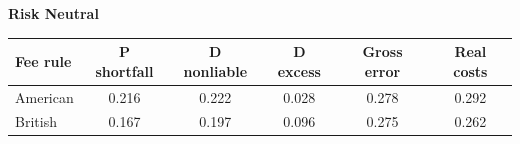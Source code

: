 \documentclass[10pt,border=5pt,varwidth=17cm]{standalone}
\begin{document}
\begingroup
\small
\setlength{\tabcolsep}{5pt}
\renewcommand{\arraystretch}{1.20}
\noindent\textbf{Risk Neutral}\par\smallskip
\noindent\begin{tabularx}{\linewidth}{@{}>{\raggedright\arraybackslash}Xccccc@{}}
\toprule
\textbf{Fee rule} & \textbf{P shortfall} & \textbf{D nonliable} & \textbf{D excess} & \textbf{Gross error} & \textbf{Real costs} \\
\midrule
American & 0.216 & 0.222 & 0.028 & 0.278 & 0.292 \\
British & 0.167 & 0.197 & 0.096 & 0.275 & 0.262 \\
\bottomrule\end{tabularx}\par\medskip
\endgroup
\end{document}
